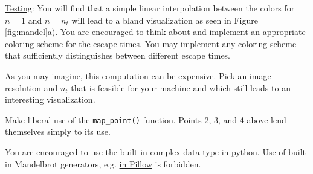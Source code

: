 \documentclass[addpoints]{exam}
\begin{document}
\begin{questions}
  \underline{Testing}: You will find that a simple linear interpolation between the colors for $n=1$ and $n=n_t$ will lead to a bland visualization as seen in Figure \ref{fig:mandel}a). You are encouraged to think about and implement an appropriate coloring scheme for the escape times. You may implement any coloring scheme that sufficiently distinguishes between different escape times.

  As you may imagine, this computation can be expensive. Pick an image resolution and $n_t$ that is feasible for your machine and which still leads to an interesting visualization.

  Make liberal use of the \texttt{map\_point()} function. Points 2, 3, and 4 above lend themselves simply to its use.

  You are encouraged to use the built-in \href{https://realpython.com/python-data-types/#complex-numbers}{complex data type} in python. Use of built-in Mandelbrot generators, e.g. \href{https://pillow.readthedocs.io/en/stable/reference/Image.html?highlight=mandelbrot#PIL.Image.effect_mandelbrot}{in Pillow} is forbidden.

\end{questions}
\end{document}
